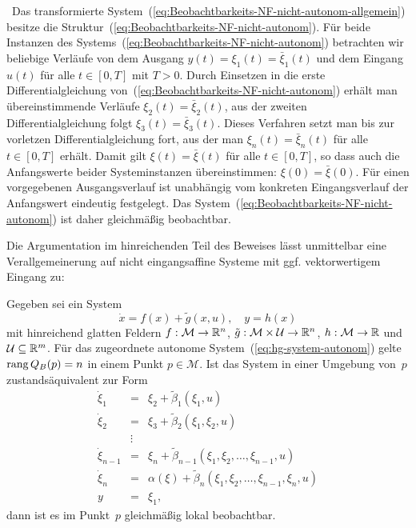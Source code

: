 \begin{svmultproof2}
\hinreichend\ Das transformierte System~(\ref{eq:Beobachtbarkeits-NF-nicht-autonom-allgemein})
besitze die Struktur~(\ref{eq:Beobachtbarkeits-NF-nicht-autonom}).
Für beide Instanzen des Systems~(\ref{eq:Beobachtbarkeits-NF-nicht-autonom})
betrachten wir beliebige Verläufe von dem Ausgang $y(t)=\xi_{1}(t)=\bar{\xi}_{1}(t)$
und dem Eingang $u(t)$ für alle $t\in[0,T]$ mit $T>0$. Durch Einsetzen
in die erste Differentialgleichung von~(\ref{eq:Beobachtbarkeits-NF-nicht-autonom})
erhält man übereinstimmende Verläufe $\xi_{2}(t)=\bar{\xi}_{2}(t)$,
aus der zweiten Differentialgleichung folgt $\xi_{3}(t)=\bar{\xi}_{3}(t)$.
Dieses Verfahren setzt man bis zur vorletzen Differentialgleichung
fort, aus der man $\xi_{n}(t)=\bar{\xi}_{n}(t)$ für alle $t\in[0,T]$
erhält. Damit gilt $\xi(t)=\bar{\xi}(t)$ für alle $t\in[0,T]$, so
dass auch die Anfangswerte beider Systeminstanzen übereinstimmen:
$\xi(0)=\bar{\xi}(0)$. Für einen vorgegebenen Ausgangsverlauf ist
unabhängig vom konkreten Eingangsverlauf der Anfangswert eindeutig
festgelegt. Das System~(\ref{eq:Beobachtbarkeits-NF-nicht-autonom})
ist daher gleichmäßig beobachtbar.
\end{svmultproof2}

Die Argumentation im hinreichenden Teil des Beweises lässt unmittelbar
eine Verallgemeinerung auf nicht eingangsaffine Systeme mit ggf. vektorwertigem
Eingang zu:
\begin{corollary}
\label{cor:Beobachtbarkeit-nicht-affin-MISO}Gegeben sei ein System
\[
\dot{x}=f(x)+\tilde{g}(x,u),\quad y=h(x)
\]
mit hinreichend glatten Feldern $f:\mathcal{M}\to{\mathbb{R}}^{n}$, $\tilde{g}:\mathcal{M}\times\mathcal{U}\to{\mathbb{R}}^{n}$,
$h:\mathcal{M}\to{\mathbb{R}}$ und $\mathcal{U}\subseteq{\mathbb{R}}^{m}$. Für das zugeordnete
autonome System~(\ref{eq:hg-system-autonom}) gelte ${\operatorname{rang}}\,Q_{B}(p)=n$
in einem Punkt $p\in\mathcal{M}$. Ist das System in einer Umgebung
von~$p$ zustands\-äquivalent zur Form
\begin{equation}
\begin{array}{lcl}
\dot{\xi}_{1} & = & \xi_{2}+\tilde{\beta}_{1}(\xi_{1},u)\\
\dot{\xi}_{2} & = & \xi_{3}+\tilde{\beta}_{2}(\xi_{1},\xi_{2},u)\\
 & \vdots\\
\dot{\xi}_{n-1} & = & \xi_{n}+\tilde{\beta}_{n-1}(\xi_{1},\xi_{2},\ldots,\xi_{n-1},u)\\
\dot{\xi}_{n} & = & \alpha(\xi)+\tilde{\beta}_{n}(\xi_{1},\xi_{2},\ldots,\xi_{n-1},\xi_{n},u)\\
y & = & \xi_{1},
\end{array}\label{eq:Beobachtbarkeits-NF-nicht-affin}
\end{equation}
dann ist es im Punkt~$p$ gleichmäßig lokal beobachtbar.
\end{corollary}

